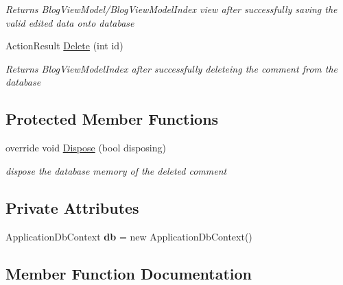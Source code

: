 \begin{DoxyCompactItemize}
\begin{DoxyCompactList}\small\item\em Returns Blog\+View\+Model/\+Blog\+View\+Model\+Index view after successfully saving the valid edited data onto database \end{DoxyCompactList}\item 
Action\+Result \hyperlink{class_alfa_accounting_1_1_controllers_1_1_comments_controller_acac79b483d887f146be3e3c8ba4b751a}{Delete} (int id)
\begin{DoxyCompactList}\small\item\em Returns Blog\+View\+Model\+Index after successfully deleteing the comment from the database \end{DoxyCompactList}\end{DoxyCompactItemize}
\subsection*{Protected Member Functions}
\begin{DoxyCompactItemize}
\item 
override void \hyperlink{class_alfa_accounting_1_1_controllers_1_1_comments_controller_a39958b019025eecac9c85cd8acf6f1db}{Dispose} (bool disposing)
\begin{DoxyCompactList}\small\item\em dispose the database memory of the deleted comment \end{DoxyCompactList}\end{DoxyCompactItemize}
\subsection*{Private Attributes}
\begin{DoxyCompactItemize}
\item 
\mbox{\label{class_alfa_accounting_1_1_controllers_1_1_comments_controller_a31240ba172f62f7b2a2fce6a4e8a9fab}} 
Application\+Db\+Context {\bfseries db} = new Application\+Db\+Context()
\end{DoxyCompactItemize}


\subsection{Member Function Documentation}
\mbox{\label{class_alfa_accounting_1_1_controllers_1_1_comments_controller_a1f9ba95111373ab74f529d964905b30e}} 
